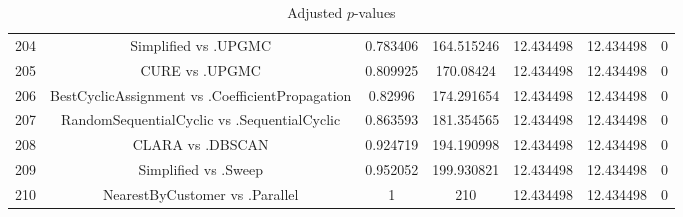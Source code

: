 \documentclass[a4paper,10pt]{article}
\begin{document}
\begin{landscape}
\begin{table}[!htp]
\begin{tabular}{ccccccc}
204&Simplified vs .UPGMC&0.783406&164.515246&12.434498&12.434498&0\\
205&CURE vs .UPGMC&0.809925&170.08424&12.434498&12.434498&0\\
206&BestCyclicAssignment vs .CoefficientPropagation&0.82996&174.291654&12.434498&12.434498&0\\
207&RandomSequentialCyclic vs .SequentialCyclic&0.863593&181.354565&12.434498&12.434498&0\\
208&CLARA vs .DBSCAN&0.924719&194.190998&12.434498&12.434498&0\\
209&Simplified vs .Sweep&0.952052&199.930821&12.434498&12.434498&0\\
210&NearestByCustomer vs .Parallel&1&210&12.434498&12.434498&0\\
\hline
\end{tabular}
\caption{Adjusted $p$-values}
\end{table}

\end{landscape}
\end{document}
